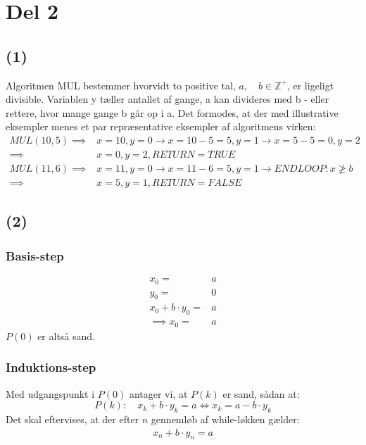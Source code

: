 \documentclass[a4paper,10pt]{article}
\begin{document}
\section*{Del 2}
\subsection*{(1)}
Algoritmen MUL bestemmer hvorvidt to positive tal, $a,\quad b \in \mathbb Z^{+}$, er ligeligt divisible. Variablen y tæller antallet af gange, a kan divideres med b - eller rettere, hvor mange gange b går op i a. Det formodes, at der med illustrative eksempler menes et par repræsentative eksempler af algoritmens virken:
\begin{equation}
\begin{aligned}	
MUL(10, 5)		\implies	& x = 10, y = 0 \rightarrow x = 10-5 = 5, y = 1 \rightarrow  x = 5-5 = 0, y = 2 \\
				\implies	& x = 0, y = 2, RETURN = TRUE \\
MUL(11, 6)		\implies 	& x = 11, y = 0 \rightarrow  x = 11-6 = 5, y = 1 \rightarrow END LOOP: x \ngeq b \\
				\implies	& x = 5, y = 1, RETURN = FALSE
\end{aligned}
\end{equation}

\subsection*{(2)}
\subsubsection*{Basis-step}
\begin{equation}
\begin{aligned}	
x_{0} 					= & a \\
y_{0}					= & 0 \\
x_{0} +b\cdot y_{0} 	= & a \\
\implies x_{0} 			= & a
\end{aligned}
\end{equation}
$P(0)$ er altså sand. 

\subsubsection*{Induktions-step}
Med udgangspunkt i $P(0)$ antager vi, at $P(k)$ er sand, sådan at:
$$
P(k): \quad x_{k} + b \cdot y_{k} = a \iff x_{k} = a - b \cdot y_{k}
$$
Det skal eftervises, at der efter $n$ gennemløb af while-løkken gælder:
\begin{equation}
\begin{aligned}	
x_{n} + b\cdot y_{n} = a
\end{aligned}
\end{equation}
\end{document}

